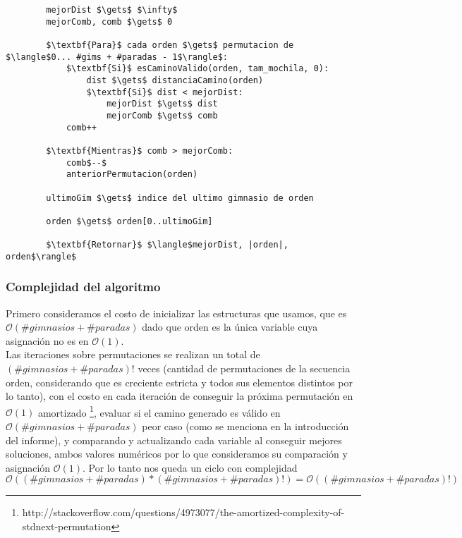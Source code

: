     \begin{lstlisting}
        mejorDist $\gets$ $\infty$
        mejorComb, comb $\gets$ 0

        $\textbf{Para}$ cada orden $\gets$ permutacion de $\langle$0... #gims + #paradas - 1$\rangle$:
            $\textbf{Si}$ esCaminoValido(orden, tam_mochila, 0):
                dist $\gets$ distanciaCamino(orden)
                $\textbf{Si}$ dist < mejorDist:
                    mejorDist $\gets$ dist
                    mejorComb $\gets$ comb
            comb++

        $\textbf{Mientras}$ comb > mejorComb:
            comb$--$
            anteriorPermutacion(orden)

        ultimoGim $\gets$ indice del ultimo gimnasio de orden

        orden $\gets$ orden[0..ultimoGim]

        $\textbf{Retornar}$ $\langle$mejorDist, |orden|, orden$\rangle$
    \end{lstlisting}

    \subsubsection{Complejidad del algoritmo}

    Primero consideramos el costo de inicializar las estructuras que usamos, que es $\mathcal{O}(\#gimnasios + \#paradas)$ dado que orden es la única variable cuya asignación no es en $\mathcal{O}(1)$.
    \\

    Las iteraciones sobre permutaciones se realizan un total de $(\#gimnasios + \#paradas)!$ veces (cantidad de permutaciones de la secuencia orden, considerando que es creciente estricta y todos sus elementos distintos por lo tanto), con el costo en cada iteración de conseguir la próxima permutación en $\mathcal{O}(1)$ amortizado \footnote{http://stackoverflow.com/questions/4973077/the-amortized-complexity-of-stdnext-permutation}, evaluar si el camino generado es válido en $\mathcal{O}(\#gimnasios + \#paradas)$ peor caso (como se menciona en la introducción del informe), y comparando y actualizando cada variable al conseguir mejores soluciones, ambos valores numéricos por lo que consideramos su comparación y asignación $\mathcal{O}(1)$. Por lo tanto nos queda un ciclo con complejidad $\mathcal{O}((\#gimnasios + \#paradas)*(\#gimnasios + \#paradas)!) = \mathcal{O} ((\#gimnasios + \#paradas)!)$
    \\

